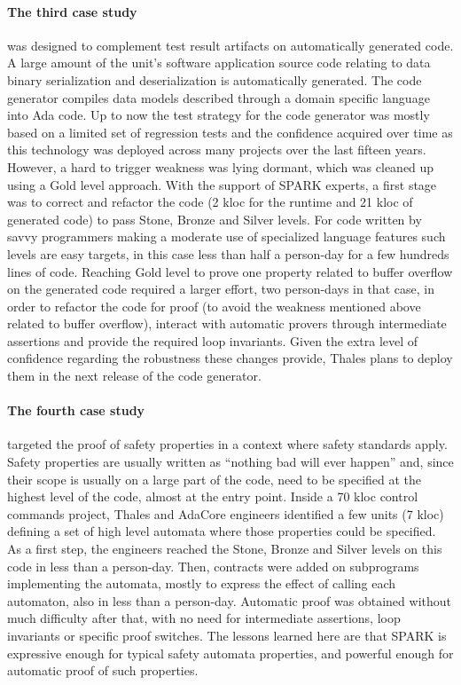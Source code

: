 \documentclass{eceasst}
\begin{document}
\paragraph{The third case study} was designed to complement test result artifacts on
automatically generated code. A large amount of the unit's software application source
code relating to data binary serialization and deserialization is automatically
generated. The code generator compiles data models described through a domain
specific language into Ada code. Up to now
the test strategy for the code generator was mostly based on a limited set of
regression tests and the confidence acquired over time as this
technology was deployed across many projects over the last fifteen years. However, a hard to
trigger weakness was lying dormant, which was cleaned up using a Gold
level approach. With the support of SPARK experts, a first stage was to correct
and refactor the code (2 kloc for the runtime and 21 kloc of generated code) to
pass Stone, Bronze and Silver levels. For code written by savvy programmers
making a moderate use of specialized language features such levels are easy
targets, in this case less than half a person-day for a few hundreds lines of
code. Reaching Gold level to prove one property related to buffer overflow
on the generated code
required a larger effort, two person-days in that case, in order to refactor
the code for proof (to avoid the weakness mentioned above related to buffer overflow),
interact with automatic provers through intermediate
assertions and provide the required loop invariants. Given the extra level of
confidence regarding the robustness these changes provide, Thales plans to
deploy them in the next release of the code generator.

\paragraph{The fourth case study} targeted the proof of safety properties in a context where
safety standards apply. Safety properties are usually written as “nothing bad
will ever happen” and, since their scope is usually on a large part of the
code, need to be specified at the highest level of the code, almost at the
entry point. Inside a 70 kloc control commands project, Thales and AdaCore
engineers identified a few units (7 kloc) defining a set of high level automata
where those properties could be specified.  As a first step, the engineers reached the
Stone, Bronze and Silver levels on this code in less than a person-day. Then,
contracts were added on subprograms implementing the automata, mostly to
express the effect of calling each automaton, also in less than a
person-day. Automatic proof was obtained without much difficulty after that,
with no need for intermediate assertions, loop invariants or specific proof
switches. The lessons learned here are that SPARK is expressive enough for
typical safety automata properties, and powerful enough for automatic proof of
such properties.
\end{document}
